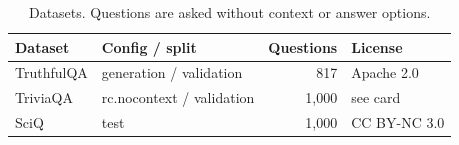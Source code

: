 \begin{table}[t]
\centering
\footnotesize
\caption{Datasets. Questions are asked without context or answer options.}
\label{tab:data}
\begin{tabular}{llrl}
\toprule
Dataset & Config / split & Questions & License \\
\midrule
TruthfulQA & generation / validation & 817 & Apache 2.0 \\
TriviaQA & rc.nocontext / validation & 1,000 & see card \\
SciQ & test & 1,000 & CC BY-NC 3.0 \\
\bottomrule
\end{tabular}
\end{table}
